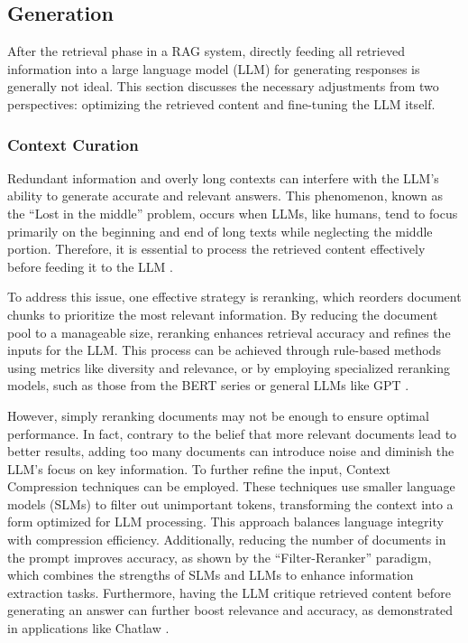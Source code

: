 \subsection{Generation}

After the retrieval phase in a RAG system, directly feeding all retrieved information into a large language model (LLM) for generating responses is generally not ideal. This section discusses the necessary adjustments from two perspectives: optimizing the retrieved content and fine-tuning the LLM itself.

\subsubsection{Context Curation}

Redundant information and overly long contexts can interfere with the LLM’s ability to generate accurate and relevant answers. This phenomenon, known as the “Lost in the middle” problem, occurs when LLMs, like humans, tend to focus primarily on the beginning and end of long texts while neglecting the middle portion. Therefore, it is essential to process the retrieved content effectively before feeding it to the LLM \cite{liu2024lost}.

To address this issue, one effective strategy is reranking, which reorders document chunks to prioritize the most relevant information. By reducing the document pool to a manageable size, reranking enhances retrieval accuracy and refines the inputs for the LLM. This process can be achieved through rule-based methods using metrics like diversity and relevance, or by employing specialized reranking models, such as those from the BERT series or general LLMs like GPT \cite{gao2023chat}.

However, simply reranking documents may not be enough to ensure optimal performance. In fact, contrary to the belief that more relevant documents lead to better results, adding too many documents can introduce noise and diminish the LLM’s focus on key information. To further refine the input, Context Compression techniques can be employed. These techniques use smaller language models (SLMs) to filter out unimportant tokens, transforming the context into a form optimized for LLM processing. This approach balances language integrity with compression efficiency. Additionally, reducing the number of documents in the prompt improves accuracy, as shown by the “Filter-Reranker” paradigm, which combines the strengths of SLMs and LLMs to enhance information extraction tasks. Furthermore, having the LLM critique retrieved content before generating an answer can further boost relevance and accuracy, as demonstrated in applications like Chatlaw \cite{gao2023retrieval, cui2023chatlaw}.

